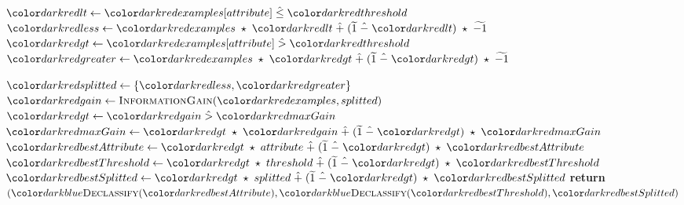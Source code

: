 \begin{algorithm}[H]
\begin{algorithmic}[1]
          \State $\red{lt} \gets \red{examples}[attribute] \hlte \red{threshold}$ 
          \State $\red{less} \gets \red{examples} \hmul \red{lt} \hplus (\enc{1} \hminus \red{lt}) \hmul \enc{-1} $ 
          \State $\red{gt} \gets \red{examples}[attribute] \hgt \red{threshold}$
          \State $\red{greater} \gets \red{examples} \hmul \red{gt} \hplus (\enc{1} \hminus \red{gt}) \hmul \enc{-1} $

          \State $\red{splitted} \gets \{\red{less}, \red{greater}\}$
          \State $\red{gain} \gets  \textsc{InformationGain}(\red{examples}, splitted)$
          \State $\red{gt} \gets \red{gain} \hgt  \red{maxGain}$
          \State $\red{maxGain} \gets \red{gt} \hmul \red{gain} \hplus (\enc{1} \hminus \red{gt}) \hmul \red{maxGain}$ 
          \State $\red{bestAttribute} \gets \red{gt} \hmul attribute \hplus (\enc{1} \hminus \red{gt}) \hmul \red{bestAttribute}$
          \State $\red{bestThreshold} \gets \red{gt} \hmul threshold \hplus (\enc{1} \hminus \red{gt}) \hmul \red{bestThreshold}$
          \State $\red{bestSplitted} \gets \red{gt} \hmul splitted \hplus (\enc{1} \hminus \red{gt}) \hmul \red{bestSplitted}$
        \EndFor
    \EndIf
  \EndFor
  \State \textbf{return} $(\blue{\textsc{Declassify}}(\red{bestAttribute}), \blue{\textsc{Declassify}}(\red{bestThreshold}), \red{bestSplitted})$
\EndProcedure
\end{algorithmic}
\end{algorithm}

